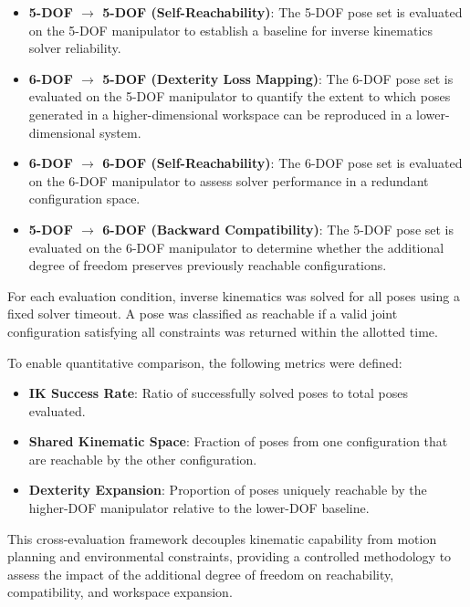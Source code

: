 \documentclass[conference]{IEEEtran}
\begin{document}
	\begin{itemize}
		\item \textbf{5-DOF $\rightarrow$ 5-DOF (Self-Reachability)}:  
		The 5-DOF pose set is evaluated on the 5-DOF manipulator to establish a baseline for inverse kinematics solver reliability.
		
		\item \textbf{6-DOF $\rightarrow$ 5-DOF (Dexterity Loss Mapping)}:  
		The 6-DOF pose set is evaluated on the 5-DOF manipulator to quantify the extent to which poses generated in a higher-dimensional workspace can be reproduced in a lower-dimensional system.
		
		\item \textbf{6-DOF $\rightarrow$ 6-DOF (Self-Reachability)}:  
		The 6-DOF pose set is evaluated on the 6-DOF manipulator to assess solver performance in a redundant configuration space.
		
		\item \textbf{5-DOF $\rightarrow$ 6-DOF (Backward Compatibility)}:  
		The 5-DOF pose set is evaluated on the 6-DOF manipulator to determine whether the additional degree of freedom preserves previously reachable configurations.
	\end{itemize}
	
	For each evaluation condition, inverse kinematics was solved for all poses using a fixed solver timeout. A pose was classified as reachable if a valid joint configuration satisfying all constraints was returned within the allotted time. 
	
	To enable quantitative comparison, the following metrics were defined:
	
	\begin{itemize}
		\item \textbf{IK Success Rate}: Ratio of successfully solved poses to total poses evaluated.
		
		\item \textbf{Shared Kinematic Space}: Fraction of poses from one configuration that are reachable by the other configuration.
		
		\item \textbf{Dexterity Expansion}: Proportion of poses uniquely reachable by the higher-DOF manipulator relative to the lower-DOF baseline.
	\end{itemize}
	
	This cross-evaluation framework decouples kinematic capability from motion planning and environmental constraints, providing a controlled methodology to assess the impact of the additional degree of freedom on reachability, compatibility, and workspace expansion.
	
\end{document}
